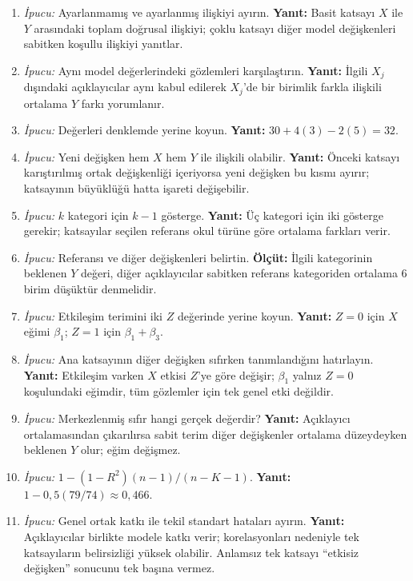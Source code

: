 \begin{enumerate}[leftmargin=*,itemsep=5pt]
\item \emph{İpucu:} Ayarlanmamış ve ayarlanmış ilişkiyi ayırın.
\textbf{Yanıt:} Basit katsayı $X$ ile $Y$ arasındaki toplam doğrusal ilişkiyi;
çoklu katsayı diğer model değişkenleri sabitken koşullu ilişkiyi yanıtlar.
\item \emph{İpucu:} Aynı model değerlerindeki gözlemleri karşılaştırın.
\textbf{Yanıt:} İlgili $X_j$ dışındaki açıklayıcılar aynı kabul edilerek
$X_j$'de bir birimlik farkla ilişkili ortalama $Y$ farkı yorumlanır.
\item \emph{İpucu:} Değerleri denklemde yerine koyun.
\textbf{Yanıt:} $30+4(3)-2(5)=32$.
\item \emph{İpucu:} Yeni değişken hem $X$ hem $Y$ ile ilişkili olabilir.
\textbf{Yanıt:} Önceki katsayı karıştırılmış ortak değişkenliği içeriyorsa yeni
değişken bu kısmı ayırır; katsayının büyüklüğü hatta işareti değişebilir.
\item \emph{İpucu:} $k$ kategori için $k-1$ gösterge.
\textbf{Yanıt:} Üç kategori için iki gösterge gerekir; katsayılar seçilen
referans okul türüne göre ortalama farkları verir.
\item \emph{İpucu:} Referansı ve diğer değişkenleri belirtin.
\textbf{Ölçüt:} İlgili kategorinin beklenen $Y$ değeri, diğer açıklayıcılar
sabitken referans kategoriden ortalama 6 birim düşüktür denmelidir.
\item \emph{İpucu:} Etkileşim terimini iki $Z$ değerinde yerine koyun.
\textbf{Yanıt:} $Z=0$ için $X$ eğimi $\beta_1$; $Z=1$ için
$\beta_1+\beta_3$.
\item \emph{İpucu:} Ana katsayının diğer değişken sıfırken tanımlandığını hatırlayın.
\textbf{Yanıt:} Etkileşim varken $X$ etkisi $Z$'ye göre değişir; $\beta_1$
yalnız $Z=0$ koşulundaki eğimdir, tüm gözlemler için tek genel etki değildir.
\item \emph{İpucu:} Merkezlenmiş sıfır hangi gerçek değerdir?
\textbf{Yanıt:} Açıklayıcı ortalamasından çıkarılırsa sabit terim diğer
değişkenler ortalama düzeydeyken beklenen $Y$ olur; eğim değişmez.
\item \emph{İpucu:} $1-(1-R^2)(n-1)/(n-K-1)$.
\textbf{Yanıt:} $1-0{,}5(79/74)\approx0{,}466$.
\item \emph{İpucu:} Genel ortak katkı ile tekil standart hataları ayırın.
\textbf{Yanıt:} Açıklayıcılar birlikte modele katkı verir; korelasyonları
nedeniyle tek katsayıların belirsizliği yüksek olabilir. Anlamsız tek katsayı
``etkisiz değişken'' sonucunu tek başına vermez.

\end{enumerate}
